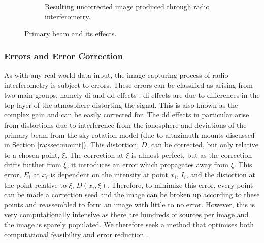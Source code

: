 \begin{figure}[H]
\begin{subfigure}{0.45\textwidth}
	\caption{Resulting uncorrected image produced through radio interferometry.}
	\label{ra:fig:uncorr}
  \end{subfigure}
  \caption{Primary beam and its effects.}
\end{figure}
%
\subsubsection{Errors and Error Correction}\label{ra:ssec:eec}
As with any real-world data input, the image capturing process of radio interferometry is subject to errors. These errors can be classified as arising from two main groups, namely \gls{di} and \gls{dd} effects \citep{smirnov2011revisiting}. \gls{di} effects are due to differences in the top layer of the atmosphere distorting the signal. This is also known as the complex gain and can be easily corrected for. The \gls{dd} effects in particular arise from distortions due to interference from the ionosphere and deviations of the primary beam from the sky rotation model (due to altazimuth mounts discussed in Section \ref{ra:ssec:mount}). This distortion, $D$, can be corrected, but only relative to a chosen point, $\xi$. The correction at $\xi$ is almost perfect, but as the correction drifts further from $\xi$, it introduces an error which propagates away from $\xi$. This error, $E_i$ at $x_i$ is dependent on the intensity at point $x_i$, $I_i$, and the distortion at the point relative to $\xi$, $D(x_i,\xi)$. Therefore, to minimize this error, every point can be made a correction seed and the image can be broken up according to these points and reassembled to form an image with little to no error. However, this is very computationally intensive as there are hundreds of sources per image and the image is sparely populated. We therefore seek a method that optimises both computational feasibility and error reduction \citep{smirnov2015radio}.
